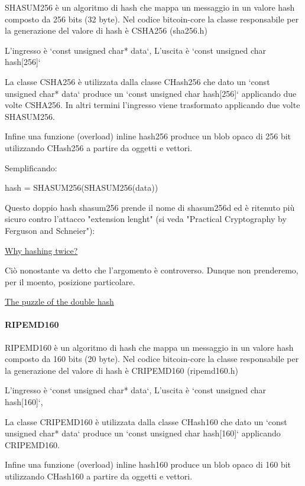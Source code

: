 \documentclass{article}
\begin{document}
SHASUM256 è un algoritmo di hash che mappa un messaggio in un valore hash composto da 256 bits (32 byte).
Nel codice bitcoin-core la classe responsabile per la generazione del valore di hash è CSHA256 (sha256.h)

L'ingresso è `const unsigned char* data`,
L'uscita è `const unsigned char hash[256]`

La classe CSHA256 è utilizzata dalla classe CHash256 che dato un `const unsigned char* data` produce un `const unsigned char hash[256]`
applicando due volte CSHA256. In altri termini l'ingresso viene trasformato applicando due volte SHASUM256.

Infine una funzione (overload) inline hash256 produce un blob opaco di 256 bit utilizzando CHash256 a partire da oggetti e vettori.

Semplificando:

hash = SHASUM256(SHASUM256(data))

Questo doppio hash shasum256 prende il nome di shasum256d ed è ritenuto più sicuro contro l'attacco "extension lenght" (si veda "Practical Cryptography by Ferguson and Schneier"):

\href{https://crypto.stackexchange.com/questions/50017/why-hashing-twice}{Why hashing twice?}

Ciò nonostante va detto che l'argomento è controverso. Dunque non prenderemo, per il moento, posizione particolare.

\href{https://medium.com/@craig_10243/the-puzzle-of-the-double-hash-968196edb06d}{The puzzle of the double hash}

\paragraph{RIPEMD160}

RIPEMD160 è un algoritmo di hash che mappa un messaggio in un valore hash composto da 160 bits (20 byte).
Nel codice bitcoin-core la classe responsabile per la generazione del valore di hash è CRIPEMD160 (ripemd160.h)

L'ingresso è `const unsigned char* data`,
L'uscita è `const unsigned char hash[160]`,

La classe CRIPEMD160 è utilizzata dalla classe CHash160 che dato un `const unsigned char* data` produce un `const unsigned char hash[160]`
applicando CRIPEMD160.

Infine una funzione (overload) inline hash160 produce un blob opaco di 160 bit utilizzando CHash160 a partire da oggetti e vettori.
\end{document}

